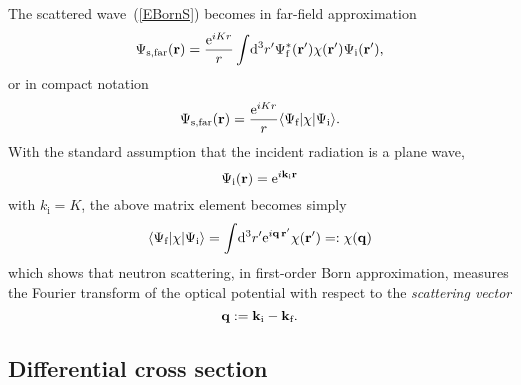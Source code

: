 The scattered wave~(\ref{EBornS})
becomes in far-field approximation 
\begin{equation}\label{Esandwich}
  \Psi_\text{s,far}(\mathbf{r})
  = \frac{{\rm e}^{iKr}}{r}
    \int\!{\rm d}^3r'
    \Psi^*_\text{f}(\mathbf{r}')\chi(\mathbf{r}')\Psi_\text{i}(\mathbf{r}'),
\end{equation}
or in compact notation
\begin{equation}\label{EsandwichC}
  \Psi_\text{s,far}(\mathbf{r})
  = \frac{{\rm e}^{iKr}}{r}
    \langle \Psi_\text{f}|\chi|\Psi_\text{i}\rangle.
\end{equation}
With the standard assumption
that the incident radiation is a plane wave,
\begin{equation}\label{EPsi0Plane}
  \Psi_\text{i}(\mathbf{r})={\rm e}^{i \mathbf{k}_\text{i} \mathbf{r}}
\end{equation}
with $k_\text{i}=K$,
the above matrix element becomes simply
\begin{equation}\label{EBornQ}
  \langle \Psi_\text{f}|\chi|\Psi_\text{i}\rangle
  = \int\!{\rm d}^3r' {\rm e}^{i\mathbf{q}\,\mathbf{r}'}\chi(\mathbf{r}')
  =: \chi(\mathbf{q})
\end{equation}
which shows that neutron scattering,
in first-order Born approximation,
measures the Fourier transform
of the optical potential
with respect to the \textit{scattering vector}
\begin{equation}
  \mathbf{q}:=\mathbf{k}_\text{i}-\mathbf{k}_\text{f}.
\end{equation}


\subsection{Differential cross section}

